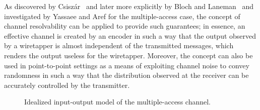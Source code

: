 \documentclass[journal]{IEEEtran}
\newcommand{\channelpmf}{q}
\newcommand{\channelInOne}{X}
\newcommand{\channelInTwo}{Y}
\newcommand{\channelOut}{Z}
\newcommand{\channel}{\mathcal{W}}
\begin{document}
As discovered by Csiszár~\cite{CsiszarSecrecy} and later more
explicitly by Bloch and Laneman~\cite{BlochStrongSecrecy} and
investigated by Yassaee and Aref \cite{YassaeeMACWiretap} for the
multiple-access case, the concept of channel resolvability can be
applied to provide such guarantees; in essence, an effective channel
is created by an encoder in such a way that the output observed by a
wiretapper is almost independent of the transmitted messages, which
renders the output useless for the wiretapper. Moreover, the concept
can also be used in point-to-point settings as a means of exploiting
channel noise to convey randomness in such a way that the distribution
observed at the receiver can be accurately controlled by the
transmitter.

\begin{figure}
\begin{center}
\end{center}
\caption{Idealized input-output model of the multiple-access channel.}
\label{figure:channel-idealized}
\end{figure}
\end{document}
